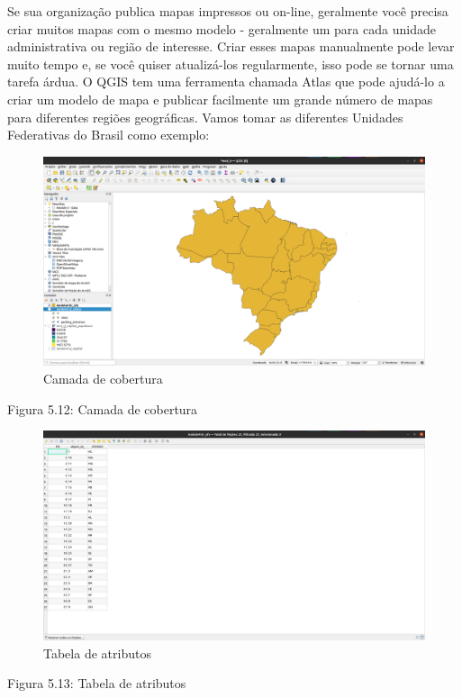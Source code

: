 \documentclass[
  portuguese,
]{krantz}
\begin{document}
Se sua organização publica mapas impressos ou on-line, geralmente você precisa criar muitos mapas com o mesmo modelo - geralmente um para cada unidade administrativa ou região de interesse. Criar esses mapas manualmente pode levar muito tempo e, se você quiser atualizá-los regularmente, isso pode se tornar uma tarefa árdua. O QGIS tem uma ferramenta chamada Atlas que pode ajudá-lo a criar um modelo de mapa e publicar facilmente um grande número de mapas para diferentes regiões geográficas. Vamos tomar as diferentes Unidades Federativas do Brasil como exemplo:

\begin{figure}
\centering
\includegraphics{media/modulo5/atlas-coverage.png}
\caption{Camada de cobertura}
\end{figure}

Figura 5.12: Camada de cobertura

\begin{figure}
\centering
\includegraphics{media/modulo5/atlas-attr.png}
\caption{Tabela de atributos}
\end{figure}

Figura 5.13: Tabela de atributos
\end{document}
